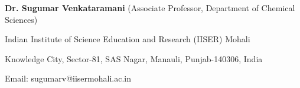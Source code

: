 \textbf{Dr. Sugumar Venkataramani} (Associate Professor, Department of Chemical Sciences)

Indian Institute of Science Education and Research (IISER) Mohali

Knowledge City, Sector-81, SAS Nagar, Manauli, Punjab-140306, India

Email: sugumarv@iisermohali.ac.in